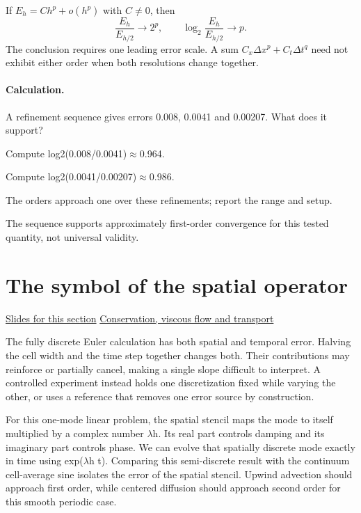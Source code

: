 \documentclass[11pt,letterpaper]{article}
\theoremstyle{definition}\newtheorem{definition}{Definition}\newtheorem{example}{Example}
\numberwithin{equation}{section}
\begin{document}
If $E_h=Ch^p+o(h^p)$ with $C\ne0$, then
\[
 \frac{E_h}{E_{h/2}}\longrightarrow2^p,
 \qquad\log_2\frac{E_h}{E_{h/2}}\longrightarrow p.
\]
The conclusion requires one leading error scale. A sum $C_x\Delta x^p+C_t\Delta t^q$ need not exhibit either order when both resolutions change together.

\paragraph{Calculation.} A refinement sequence gives errors 0.008, 0.0041 and 0.00207. What does it support?

Compute log2(0.008/0.0041)\ensuremath{\approx}0.964.

Compute log2(0.0041/0.00207)\ensuremath{\approx}0.986.

The orders approach one over these refinements; report the range and setup.

The sequence supports approximately first-order convergence for this tested quantity, not universal validity.
\section{The symbol of the spatial operator}
\hypertarget{note-the-symbol-of-the-spatial-operator}{}\label{note:the-symbol-of-the-spatial-operator}
{\small \href{slides.html\#frame=fourier-diagonalization\&step=1}{Slides for this section} \quad \href{../modules/cfd/index.html}{Conservation, viscous flow and transport}}\par
The fully discrete Euler calculation has both spatial and temporal error. Halving the cell width and the time step together changes both. Their contributions may reinforce or partially cancel, making a single slope difficult to interpret. A controlled experiment instead holds one discretization fixed while varying the other, or uses a reference that removes one error source by construction.

For this one-mode linear problem, the spatial stencil maps the mode to itself multiplied by a complex number \ensuremath{\lambda}h. Its real part controls damping and its imaginary part controls phase. We can evolve that spatially discrete mode exactly in time using exp(\ensuremath{\lambda}h t). Comparing this semi-discrete result with the continuum cell-average sine isolates the error of the spatial stencil. Upwind advection should approach first order, while centered diffusion should approach second order for this smooth periodic case.
\end{document}
